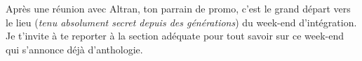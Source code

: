 Après une réunion avec Altran, ton parrain de promo, c'est le grand départ
vers le lieu (\emph{tenu absolument secret depuis des générations}) du week-end
d'intégration. Je t'invite à te reporter à la section adéquate pour tout
savoir sur ce week-end qui s'annonce déjà d'anthologie.
